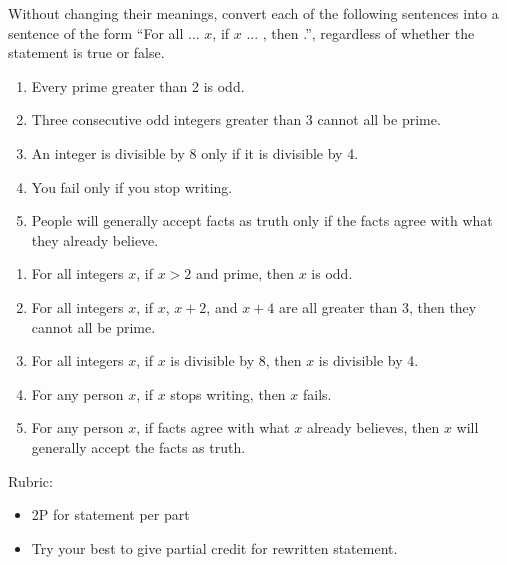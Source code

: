 \documentclass{article}
\theoremstyle{definition}
\begin{document}
\begin{question}
   Without changing their meanings, convert each of the following sentences into a sentence of the form ``For all ... $x$, if $x$ ... , then .'', regardless of whether the statement is true or false.
    \begin{enumerate}
        \item Every prime greater than 2 is odd.
        \item Three consecutive odd integers greater than 3 cannot all be prime.
        \item An integer is divisible by 8 only if it is divisible by 4.
        \item You fail only if you stop writing.
        \item People will generally accept facts as truth only if the facts agree with what they already believe.
    \end{enumerate}
\end{question}
\begin{solution}
    \begin{enumerate}
        \item For all integers $x$, if $x>2$ and prime, then $x$ is odd. 
        \item For all integers $x$, if $x$, $x+2$, and $x+4$ are all greater than 3, then they cannot all be prime. 
        \item For all integers $x$, if $x$ is divisible by 8, then $x$ is divisible by 4.
        \item For any person $x$, if $x$ stops writing, then $x$ fails.
        \item For any person $x$, if facts agree with what $x$ already believes, then $x$ will generally accept the facts as truth.
    \end{enumerate}

{\color{red} Rubric:
\begin{itemize}
\item 2P for statement per part
\item Try your best to give partial credit for rewritten statement.
\end{itemize}}
\end{solution}
\end{document}

